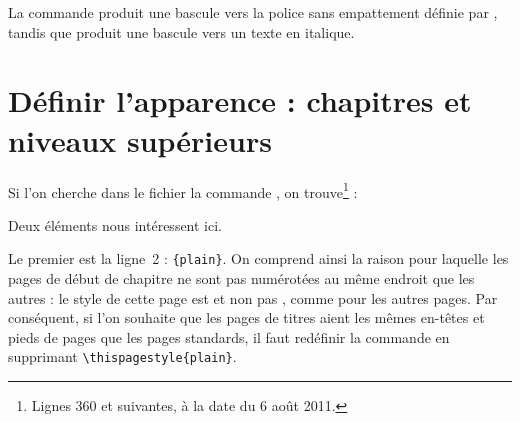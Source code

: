\begin{latexcode}
\makeatletter
\renewcommand\section{\@startsection {section}{1}{\z@}%
                             {-3.5ex \@plus -1ex \@minus -.2ex}%
                             {2.3ex \@plus.2ex}%
                             {\sffamily\Large\itshape}}
\makeatother
\end{latexcode}

La commande  produit une bascule vers la police sans empattement définie par , tandis que  produit une bascule vers un texte en italique.

\section{Définir l'apparence : chapitres et niveaux supérieurs}

Si l'on cherche dans le fichier  la commande , on trouve\footnote{Lignes 360 et suivantes, à la date du 6 août 2011.} :

\begin{latexcode}
\newcommand\chapter{\if@openright\cleardoublepage\else\clearpage\fi
                    \thispagestyle{plain}%
                    \global\@topnum\z@
                    \@afterindentfalse
                    \secdef\@chapter\@schapter}
\end{latexcode}

Deux éléments nous intéressent ici. 

Le premier est la ligne~2 : \verb|{plain}|. On comprend ainsi la raison pour laquelle les  pages de début de chapitre ne sont pas numérotées au même endroit que les autres : le style de cette page est  et non pas , comme pour les autres pages. Par conséquent, si l'on souhaite que les pages de titres aient les mêmes en-têtes et pieds de pages que les pages standards, il faut redéfinir la commande  en supprimant \verb|\thispagestyle{plain}|.\label{entetechapter}\label{chapitrepagestyle}

\begin{latexcode}
\makeatletter
\renewcommand\chapter{\if@openright\cleardoublepage %
                    \else\clearpage\fi
                    \global\@topnum\z@
                    \@afterindentfalse
                    \secdef\@chapter\@schapter}
\makeatother
\end{latexcode}

